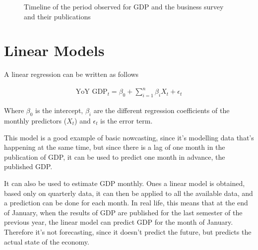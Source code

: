 \documentclass[12pt,a4paper,oneside]{book}
\newcommand{\ImageWidth}{11cm}
\begin{document}
\begin{figure}[!htp]
     \centering \footnotesize
{}
    \caption{Timeline of the period observed for GDP and the business survey and their publications}
    \label{fig:time of the data}
\end{figure}


\section{Linear Models}

A linear regression can be written as follows

\begin{eqnarray}
    \text{YoY GDP}_{t} = \beta_0 + \sum^n_{i = 1}
       \beta_{i} X_{t} + \epsilon_t 
\end{eqnarray}

Where $\beta_{0}$ is the intercept, $\beta_{i}$ are the different regression coefficients of the monthly predictors ($X_{t}$) and $\epsilon_t$ is the error term.

This model is a good example of basic nowcasting, since it's modelling data that's happening at the same time, but since there is a lag of one month in the publication of GDP, it can be used to predict one month in advance, the published GDP.

It can also be used to estimate GDP monthly. Ones a linear model is obtained, based only on quarterly data, it can then be applied to all the available data, and a prediction can be done for each month.
In real life, this means that at the end of January, when the results of GDP are published for the last semester of the previous year, the linear model can predict GDP for the month of January. Therefore it's not forecasting, since it doesn't predict the future, but predicts the actual state of the economy.
\end{document}
